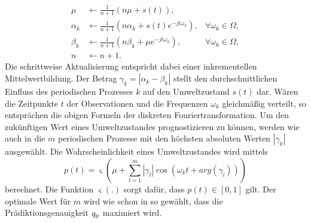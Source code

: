 \begin{align}
	\mu &\leftarrow \frac{1}{n+1}(n \mu + s(t)), \\
	\alpha_k &\leftarrow \frac{1}{n+1} (n \alpha_k + s(t) e^{-jt\omega_k}) ,  &\forall \omega_k \in \Omega, \\
	\beta_k &\leftarrow \frac{1}{n+1} (n \beta_k + \mu e^{-jt\omega_k}) ,  &\forall \omega_k \in \Omega, \\
	n &\leftarrow n + 1 .
	\label{eq:Update_step_FreMEn}
\end{align}
Die schrittweise Aktualisierung entspricht dabei einer inkrementellen Mittelwertbildung. Der Betrag $\gamma_k = |\alpha_k - \beta_k|$ stellt den durchschnittlichen Einfluss des periodischen Prozesses $k$ auf den Umweltzustand $s(t)$ dar.
Wären die Zeitpunkte $t$ der Observationen und die Frequenzen $\omega_k$ gleichmäßig verteilt, so entsprächen die obigen Formeln der diskreten Fouriertransformation.
Um den zukünftigen Wert eines Umweltzustandes prognostizieren zu können, werden wie auch in \cite{Krajnik.2014} die $m$ periodischen Prozesse mit den höchsten absoluten Werten $|\gamma_k|$ ausgewählt. Die Wahrscheinlichkeit eines Umweltzustandes wird mittels
\begin{equation}
	p(t) = \varsigma(\mu + \sum_{l=1}^{m} |\gamma_l|\cos(\omega_k t + arg(\gamma_l)))
	\label{eq:State_probability}
\end{equation}
berechnet. Die Funktion $\varsigma(.)$ sorgt dafür, dass $p(t) \in [0,1]$ gilt. Der optimale Wert für $m$ wird wie schon in \cite{Krajnik.2014} so gewählt, dass die Prädiktionsgenauigkeit $q_{\mathrm{p}}$ maximiert wird. \\

